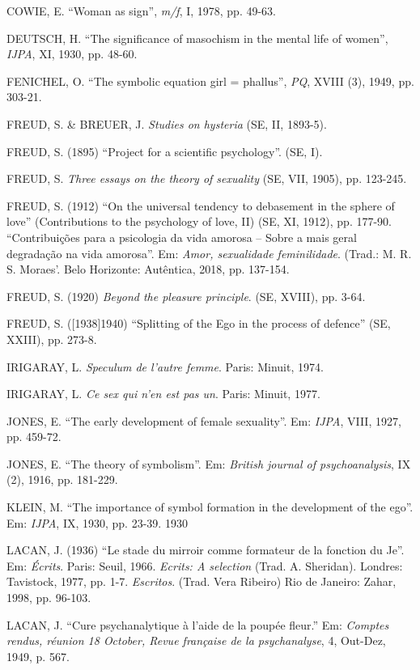 COWIE, E. ``Woman as sign'', \emph{m/f}, I, 1978, pp. 49-63.

DEUTSCH, H. ``The significance of masochism in the mental life of women'',
\emph{IJPA}, XI, 1930, pp. 48-60.

FENICHEL, O. ``The symbolic equation girl = phallus'', \emph{PQ}, XVIII
(3), 1949, pp. 303-21.

FREUD, S. \& BREUER, J. \emph{Studies on hysteria} (SE, II, 1893-5).

FREUD, S. (1895) ``Project for a scientific psychology''. (SE, I).

FREUD, S. \emph{Three essays on the theory of sexuality} (SE, VII,
1905), pp. 123-245.

FREUD, S. (1912) ``On the universal tendency to debasement in the sphere
of love'' (Contributions to the psychology of love, II) (SE, XI, 1912),
pp. 177-90. ``Contribuições para a psicologia da vida amorosa -- Sobre a
mais geral degradação na vida amorosa''. Em: \emph{Amor, sexualidade
feminilidade}. (Trad.: M. R. S. Moraes'. Belo Horizonte: Autêntica,
2018, pp. 137-154.

FREUD, S. (1920) \emph{Beyond the pleasure principle}. (SE, XVIII), pp.
3-64.

FREUD, S. ({[}1938{]}1940) ``Splitting of the Ego in the process of
defence'' (SE, XXIII), pp. 273-8.

IRIGARAY, L. \emph{Speculum de l'autre femme}. Paris: Minuit, 1974.

IRIGARAY, L. \emph{Ce sex qui n'en est pas un}. Paris: Minuit, 1977.

JONES, E. ``The early development of female sexuality''. Em:
\emph{IJPA}, VIII, 1927, pp. 459-72.

JONES, E. ``The theory of symbolism''. Em: \emph{British journal of
psychoanalysis}, IX (2), 1916, pp. 181-229.

KLEIN, M. ``The importance of symbol formation in the development of the
ego''. Em: \emph{IJPA}, IX, 1930, pp. 23-39. 1930

LACAN, J. (1936) ``Le stade du mirroir comme formateur de la fonction du
Je''. Em: \emph{Écrits}. Paris: Seuil, 1966. \emph{Ecrits: A
selection} (Trad. A. Sheridan). Londres: Tavistock, 1977, pp. 1-7.
\emph{Escritos}. (Trad. Vera Ribeiro) Rio de Janeiro: Zahar, 1998,
pp. 96-103.

LACAN, J. ``Cure psychanalytique à l'aide de la poupée fleur.'' Em:
\emph{Comptes rendus, réunion 18 October, Revue française de la
psychanalyse}, 4, Out-Dez, 1949, p. 567.

